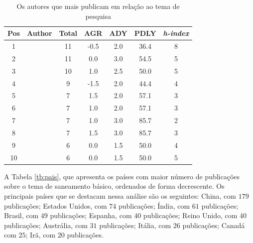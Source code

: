\begin{table}[H]
	\centering
	\caption{Os autores que mais publicam em relação ao tema de pesquisa}\label{tb:autor}
	\begin{tabular}{ccccccc}
		\hline
		Pos & Author       & Total & AGR  & ADY  & PDLY & \textit{h-index} \\
		\hline
		1 & \citeonline{2-s2.0-84973369468} & 11 & -0.5 & 2.0 & 36.4 & 8 \\
		2 & \citeonline{2-s2.0-85123707840} & 11 & 0.0 & 3.0 & 54.5 & 5 \\
		3 & \citeonline{2-s2.0-85018469706} & 10 & 1.0 & 2.5 & 50.0 & 5 \\
		4 & \citeonline{2-s2.0-85048003524} & 9 & -1.5 & 2.0 & 44.4 & 4 \\
		5 & \citeonline{2-s2.0-84964575877} & 7 & 1.5 & 2.0 & 57.1 & 3 \\
		6 & \citeonline{2-s2.0-85063200888} & 7 & 1.0 & 2.0 & 57.1 & 3 \\
		7 & \citeonline{2-s2.0-85148656225} & 7 & 1.0 & 3.0 & 85.7 & 2 \\
		8 & \citeonline{2-s2.0-85041536076} & 7 & 1.5 & 3.0 & 85.7 & 3 \\
		9 & \citeonline{2-s2.0-85130875471} & 6 & 0.0 & 1.5 & 50.0 & 4 \\
		10 & \citeonline{2-s2.0-85061810603}& 6 & 0.0 & 1.5 & 50.0 & 5 \\
		\hline
	\end{tabular}
	
\end{table}


A Tabela \ref{tb:pais}, que apresenta os países com maior número de publicações sobre o tema de saneamento básico, ordenados de forma decrescente. Os principais países que se destacam nessa análise são os seguintes: China, com $179$ publicações; Estados Unidos, com $74$ publicações; Índia, com $61$ publicações; Brasil, com $49$ publicações; Espanha, com $40$ publicações; Reino Unido, com $40$ publicações; Austrália, com $31$ publicações; Itália, com $26$ publicações; Canadá com $25$; Irã, com $20$ publicações.

